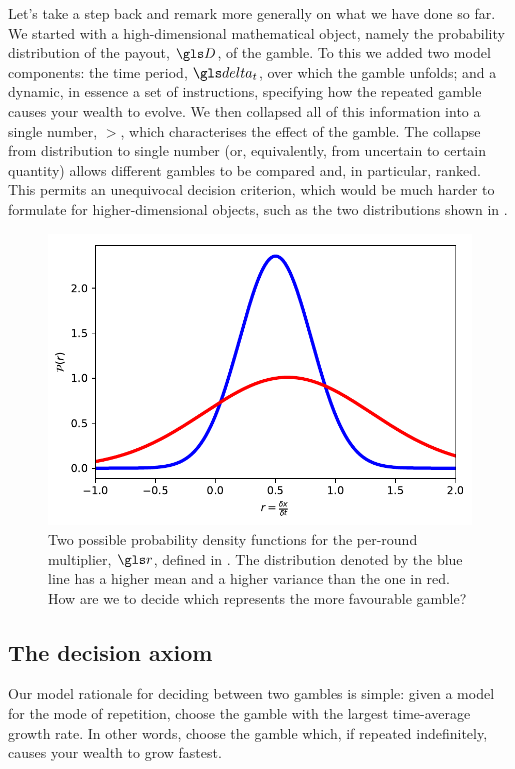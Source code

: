 Let's take a step back and remark more generally on what we have done so far. We 
started with a high-dimensional mathematical object, namely the 
probability distribution of the payout, $\gD$, of the gamble. To this we 
added two model components: the time period, $\dt$, over which the 
gamble unfolds; and a dynamic, in essence a set of instructions, specifying 
how the repeated gamble causes your wealth to evolve. We 
then collapsed all of this information into a single number, 
$\gt$, which characterises the effect of the gamble. The collapse from 
distribution to single number (or, equivalently, from uncertain to certain 
quantity) allows different gambles to be compared and, in particular, 
ranked. This permits an unequivocal decision criterion, which would be 
much harder to formulate for higher-dimensional objects, such as the 
two distributions shown in .
\begin{figure}
\centering
\includegraphics[width=\textwidth]{./chapter_2/figs/two_dists.pdf}
\caption{Two possible probability density functions for the per-round 
multiplier, $\gr$, defined in . The distribution denoted by 
the blue line has a higher mean and a higher variance than the one 
in red. How are we to decide which represents the more favourable 
gamble?}
\end{figure}

\subsection{The decision axiom}
Our model rationale for deciding between two gambles is simple: 
given a model for the mode of repetition, 
choose the gamble with the largest time-average growth rate. 
In other words, choose the gamble which, 
if repeated indefinitely, causes your wealth to grow fastest.

